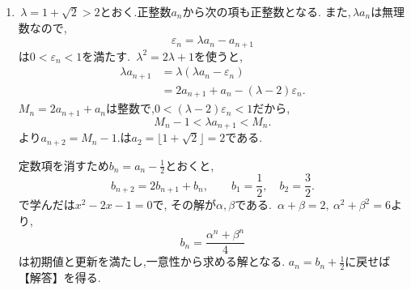     \noindent {}\par\nobreak
    \begin{enumerate}[label=(\arabic*),parsep=3pt,beginpenalty=10000,format=\bookitemlink{example-gauss-role-5}{solution}{problem}]
      \item \,$\lambda=1+\sqrt2>2$とおく.正整数$a_n$から次の項も正整数となる.
            また,\,$\lambda a_n$は無理数なので,
            \[
              \varepsilon_n=\lambda a_n-a_{n+1}
            \]
            は$0<\varepsilon_n<1$を満たす.
            \,$\lambda^2=2\lambda+1$を使うと,
            \begin{align*}
              \lambda a_{n+1}
                &=\lambda(\lambda a_n-\varepsilon_n)\\
                &=2a_{n+1}+a_n-(\lambda-2)\varepsilon_n.
            \end{align*}
            $M_n=2a_{n+1}+a_n$は整数で,$0<(\lambda-2)\varepsilon_n<1$だから,
            \[
              M_n-1<\lambda a_{n+1}<M_n.
            \]
            より$a_{n+2}=M_n-1$.は$a_2=\lfloor1+\sqrt2\rfloor=2$である.

            定数項を消すため$b_n=a_n-\frac12$とおくと,
            \[
              b_{n+2}=2b_{n+1}+b_n,
              \qquad b_1=\frac12,\quad b_2=\frac32.
            \]
            で学んだは$x^2-2x-1=0$で,
            その解が$\alpha,\beta$である.
            \,$\alpha+\beta=2,\ \alpha^2+\beta^2=6$より,
            \[
              b_n=\frac{\alpha^n+\beta^n}{4}
            \]
            は初期値と更新を満たし,一意性から求める解となる.
            $a_n=b_n+\frac12$に戻せば【解答】を得る.
    \end{enumerate}
